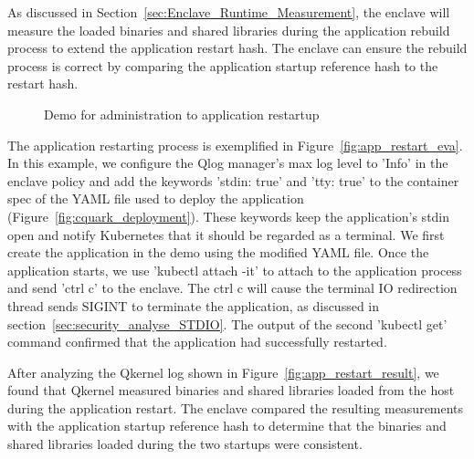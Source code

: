 As discussed in Section~\ref{sec:Enclave_Runtime_Measurement}, the enclave will measure the loaded binaries and shared libraries during the application rebuild process to extend the application restart hash. The enclave can ensure the rebuild process is correct by comparing the 
application startup reference hash to the restart hash.
\begin{figure}[!htb]


  
    \caption[Demo for  administration to application restartup]{Demo for  administration to application restartup}
\end{figure}



The application restarting process is exemplified in Figure~\ref{fig:app_restart_eva}. In this example, we configure the Qlog manager’s max log level to ’Info’ in the enclave policy and add the keywords ’stdin: true’ and ’tty: true’ to the container spec of the YAML file used to deploy the 
application (Figure~\ref{fig:cquark_deployment}). These keywords keep the application’s stdin open and notify Kubernetes that it should be regarded as a terminal. We first create the application in the demo using the modified YAML file. Once the application starts, we use ’kubectl attach -it’ to 
attach to the application process and send ’ctrl c’ to the enclave. The ctrl c will cause the terminal IO redirection thread sends SIGINT to terminate the application, as discussed in section~\ref{sec:security_analyse_STDIO}. The output of the second ’kubectl get’ command confirmed that the application had successfully restarted. 

After analyzing the Qkernel log shown in Figure~\ref{fig:app_restart_result}, we found that Qkernel measured binaries and shared libraries loaded from the host during the application restart. The enclave compared the resulting measurements with the application startup reference hash to determine that the binaries and shared libraries loaded during the two startups were 
consistent.




